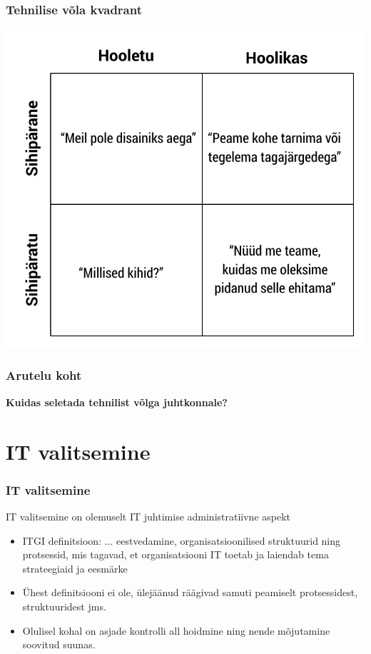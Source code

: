 \begin{frame}[fragile]
  \frametitle{Tehnilise võla kvadrant}
  	\begin{center}
			\includegraphics[width=.65\textwidth]{fowler.pdf}
	\end{center}
	\cite{fowlerdebt}
\end{frame}

\begin{frame}[fragile]
  \frametitle{Arutelu koht}
		\begin{center}
			\textbf{Kuidas seletada tehnilist võlga juhtkonnale?}
		\end{center}
\end{frame}

\section{IT valitsemine}

\begin{frame}[fragile]
  \frametitle{IT valitsemine}
  IT valitsemine on olemuselt IT juhtimise administratiivne aspekt
	\begin{itemize}
		\item ITGI definitsioon: ... eestvedamine, organisatsioonilised struktuurid ning protsessid, mis tagavad, et organisatsiooni IT toetab ja laiendab tema strateegiaid ja eesmärke \citep{insitute2003board}
		\item Ühest definitsiooni ei ole, ülejäänud räägivad samuti peamiselt protsessidest, struktuuridest jms. 
		\item Olulisel kohal on asjade kontrolli all hoidmine ning nende mõjutamine soovitud suunas. 
	\end{itemize}
\end{frame}

